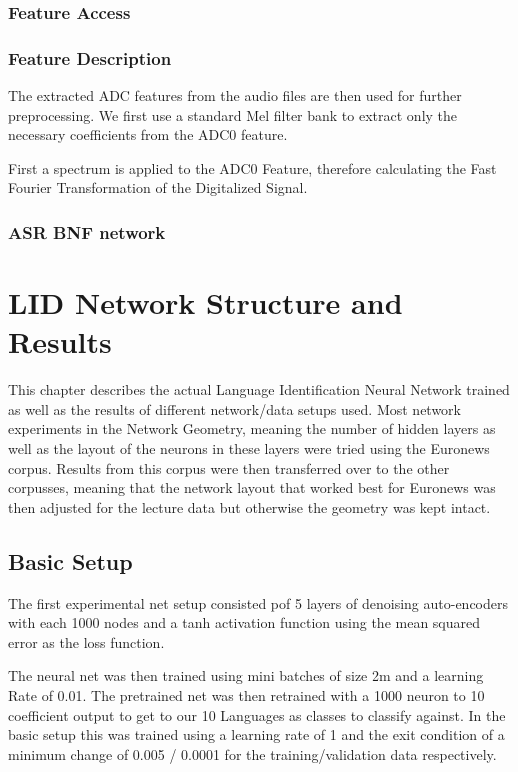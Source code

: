 \subsection{Feature Access}
\label{sec:FP:FA}

\subsection{Feature Description}
\label{sec:FP:FD}
The extracted ADC features from the audio files are then used for further preprocessing. We first use a standard Mel filter bank to extract only the necessary coefficients from the ADC0 feature. 

First a spectrum is applied to the ADC0 Feature, therefore calculating the Fast Fourier Transformation of the Digitalized Signal.

\subsection{ASR BNF network}
\label{sec:FP:Net}


\chapter{LID Network Structure and Results}
\label{ch:LIDNetwork}

This chapter describes the actual Language Identification Neural Network trained as well as the results of different network/data setups used. Most network experiments in the Network Geometry, meaning the number of hidden layers as well as the layout of the neurons in these layers were tried using the Euronews corpus. Results from this corpus were then transferred over to the other corpusses, meaning that the network layout that worked best for Euronews was then adjusted for the lecture data but otherwise the geometry was kept intact.

\section{Basic Setup}
\label{sec:LIDNetwork:Basic}

The first experimental net setup consisted pof 5 layers of denoising auto-encoders with each 1000 nodes and a tanh activation function using the mean squared error as the loss function. 

The neural net was then trained using mini batches of size 2m and a learning Rate of 0.01. The pretrained net was then retrained with a 1000 neuron to 10 coefficient output to get to our 10 Languages as classes to classify against. In the basic setup this was trained using a learning rate of 1 and the exit condition of a minimum change of 0.005 / 0.0001 for the training/validation data respectively.

